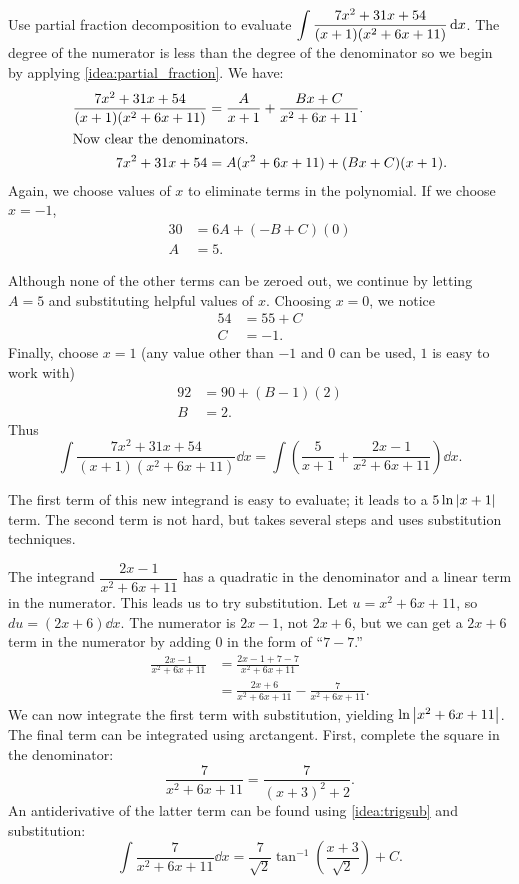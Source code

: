 \begin{example}\label{ex_pf5}%
Use partial fraction decomposition to evaluate $\displaystyle \int\frac{7x^2+31x+54}{(x+1)(x^2+6x+11)}\operatorname{d}\! x$.
\solution
The degree of the numerator is less than the degree of the denominator so we begin by applying \autoref{idea:partial_fraction}. We have:
\begin{align*}
\frac{7x^2+31x+54}{(x+1)(x^2+6x+11)} &= \frac{A}{x+1} + \frac{Bx+C}{x^2+6x+11}. \\
\intertext{Now clear the denominators.}
7x^2+31x+54 &= A(x^2+6x+11) + (Bx+C)(x+1).
\end{align*}
Again, we choose values of $x$ to eliminate terms in the polynomial.  If we choose $x=-1$,
\begin{align*}
 30&=6A + (-B+C)(0)\\
 A&= 5.
\end{align*}

Although none of the other terms can be zeroed out, we continue by letting $A=5$ and substituting helpful values of $x$. 
Choosing $x=0$, we notice
\begin{align*}
 54&= 55 +C \\
 C&= -1.
\end{align*}
Finally, choose $x=1$ (any value other than $-1$ and $0$ can be used, $1$ is easy to work with)
\begin{align*}
 92&=90 + (B-1)(2)\\
 B&= 2.
\end{align*}
Thus
\[
 \int\frac{7x^2+31x+54}{(x+1)(x^2+6x+11)}\dd x
 = \int\left(\frac{5}{x+1} + \frac{2x-1}{x^2+6x+11}\right)\dd x.
\]

The first term of this new integrand is easy to evaluate; it leads to a $5\ln\left\lvert x+1 \right\rvert$ term. The second term is not hard, but takes several steps and uses substitution techniques.

The integrand $\dfrac{2x-1}{x^2+6x+11}$ has a quadratic in the denominator and a linear term in the numerator. This leads us to try substitution. Let $u=x^2+6x+11$, so $du=(2x+6)\dd x$. The numerator is $2x-1$, not $2x+6$, but we can get a $2x+6$ term in the numerator by adding 0 in the form of ``$7-7$.''
\begin{align*}
	\frac{2x-1}{x^2+6x+11} &= \frac{2x-1+7-7}{x^2+6x+11} \\
	&= \frac{2x+6}{x^2+6x+11} - \frac{7}{x^2+6x+11}.
\end{align*}
We can now integrate the first term with substitution, yielding $\ln\left\lvert x^2+6x+11 \right\rvert$. The final term can be integrated using arctangent. First, complete the square in the denominator:
\[\frac{7}{x^2+6x+11} = \frac{7}{(x+3)^2+2}.\]
An antiderivative of the latter term can be found using \autoref{idea:trigsub} and substitution:
\[
 \int \frac7{x^2+6x+11}\dd x=\frac7{\sqrt2}\tan^{-1}\left(\frac{x+3}{\sqrt2}\right)+C.
\]


\end{example}
